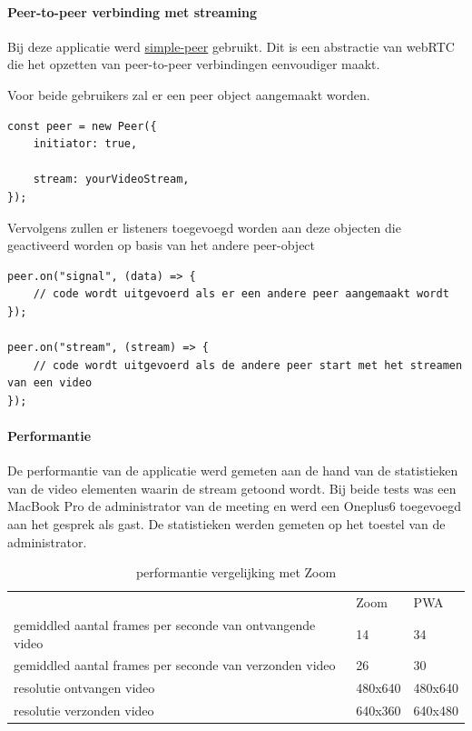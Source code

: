 		\paragraph{Peer-to-peer verbinding met streaming}
			Bij deze applicatie werd \href{https://github.com/feross/simple-peer}{simple-peer} gebruikt. Dit is een abstractie van webRTC die het opzetten van peer-to-peer verbindingen eenvoudiger maakt.
			
			Voor beide gebruikers zal er een peer object aangemaakt worden.

\begin{lstlisting}
const peer = new Peer({
	initiator: true,

	stream: yourVideoStream,
});
\end{lstlisting}
			
			Vervolgens zullen er listeners toegevoegd worden aan deze objecten die geactiveerd worden op basis van het andere peer-object
			
\begin{lstlisting}
peer.on("signal", (data) => {
	// code wordt uitgevoerd als er een andere peer aangemaakt wordt
});

peer.on("stream", (stream) => {
	// code wordt uitgevoerd als de andere peer start met het streamen van een video
});
\end{lstlisting}

		\paragraph{Performantie}
		
			De performantie van de applicatie werd gemeten aan de hand van de statistieken van de video elementen waarin de stream getoond wordt. Bij beide tests was een MacBook Pro de administrator van de meeting en werd een Oneplus6 toegevoegd aan het gesprek als gast. De statistieken werden gemeten op het toestel van de administrator.
			
			\begin{table}[H]
			\centering
			\begin{tabular}{lll}													& Zoom 			& PWA \\
				gemiddled aantal frames per seconde van ontvangende video 	 & 14				&  34 \\
				gemiddled aantal frames per seconde van verzonden video		   & 26				   & 30	 \\
				resolutie ontvangen video  						  & 480x640 	&  480x640  \\
				resolutie verzonden video						   & 640x360	& 	640x480\\
			\end{tabular}	
			\caption{performantie vergelijking met Zoom}
			\end{table}
	

